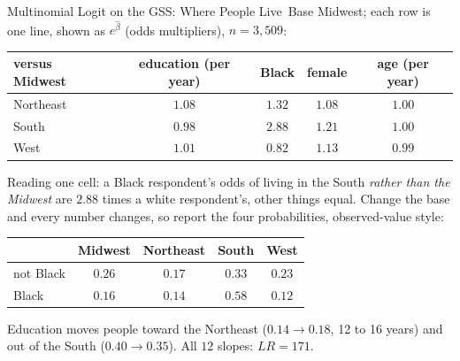 \documentclass[aspectratio=169,11pt,xcolor=dvipsnames]{beamer}
\newcommand{\core}{\,\raisebox{0.6pt}{\textcolor{corestar}{$\bigstar$}}}
\begin{document}
\begin{frame}{Multinomial Logit on the GSS: Where People Live\core}
Base Midwest; each row is one line, shown as $e^{\hat\beta}$ (odds
multipliers), $n = 3{,}509$:
\begin{center}\small
\renewcommand{\arraystretch}{1.0}
\begin{tabular}{lcccc}
\toprule
versus Midwest & education (per year) & Black & female & age (per year) \\
\midrule
Northeast & $1.08$ & $1.32$ & $1.08$ & $1.00$ \\
South & $0.98$ & $\mathbf{2.88}$ & $1.21$ & $1.00$ \\
West & $1.01$ & $0.82$ & $1.13$ & $0.99$ \\
\bottomrule
\end{tabular}
\end{center}
Reading one cell: a Black respondent's odds of living in the South
\emph{rather than the Midwest} are $2.88$ times a white respondent's,
other things equal. Change the base and every number changes, so report
the four probabilities, observed-value style:
\begin{center}\small
\renewcommand{\arraystretch}{1.0}
\begin{tabular}{lcccc}
\toprule
 & Midwest & Northeast & South & West \\
\midrule
not Black & $0.26$ & $0.17$ & $0.33$ & $0.23$ \\
Black & $0.16$ & $0.14$ & $0.58$ & $0.12$ \\
\bottomrule
\end{tabular}
\end{center}
Education moves people toward the Northeast ($0.14 \to 0.18$, 12 to 16
years) and out of the South ($0.40 \to 0.35$). All $12$ slopes: $LR = 171$.
\end{frame}
\end{document}
